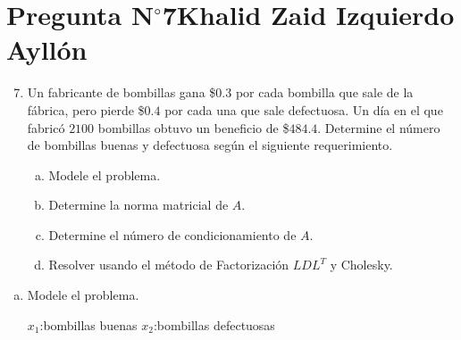 \section{Pregunta N$^{\circ}$7\qquad Khalid Zaid Izquierdo Ayllón}

\begin{frame}
	\begin{enumerate}\setcounter{enumi}{6}
		\item

		      Un fabricante de bombillas gana \$$0.3$ por cada bombilla
		      que sale de la fábrica, pero pierde \$$0.4$ por cada una
			      que sale defectuosa.
			      Un día en el que fabricó $2100$ bombillas obtuvo un
		      beneficio de \$$484.4$.
		      Determine el número de bombillas buenas y defectuosa
		      según el siguiente requerimiento.

		      \begin{enumerate}[a)]
			      \item

			            Modele el problema.

			      \item
			            Determine la norma matricial de $A$.

			      \item

			            Determine el número de condicionamiento de $A$.

			      \item

			            Resolver usando el método de Factorización
			            $LDL^{T}$ y Cholesky.
		      \end{enumerate}

	\end{enumerate}

	\begin{solution}
		\begin{enumerate}[a)]
			\item
			      Modele el problema.

			      $x_{1}$:bombillas buenas \qquad $x_{2}$:bombillas defectuosas


\end{enumerate}
\end{solution}
\end{frame}
